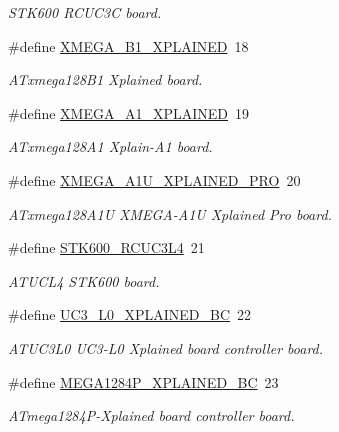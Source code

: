 \begin{DoxyCompactItemize}
\begin{DoxyCompactList}\small\item\em S\+T\+K600 R\+C\+U\+C3C board. \end{DoxyCompactList}\item 
\#define \mbox{\hyperlink{group__group__common__boards_ga65d609abff1a09882fd8a778c97f8ab2}{X\+M\+E\+G\+A\+\_\+\+B1\+\_\+\+X\+P\+L\+A\+I\+N\+ED}}~18
\begin{DoxyCompactList}\small\item\em A\+Txmega128\+B1 Xplained board. \end{DoxyCompactList}\item 
\#define \mbox{\hyperlink{group__group__common__boards_gae79074f51491bf88c25efd857b92cbd4}{X\+M\+E\+G\+A\+\_\+\+A1\+\_\+\+X\+P\+L\+A\+I\+N\+ED}}~19
\begin{DoxyCompactList}\small\item\em A\+Txmega128\+A1 Xplain-\/\+A1 board. \end{DoxyCompactList}\item 
\#define \mbox{\hyperlink{group__group__common__boards_ga966caec7a287f05d293e525b0ee0ee4d}{X\+M\+E\+G\+A\+\_\+\+A1\+U\+\_\+\+X\+P\+L\+A\+I\+N\+E\+D\+\_\+\+P\+RO}}~20
\begin{DoxyCompactList}\small\item\em A\+Txmega128\+A1U X\+M\+E\+G\+A-\/\+A1U Xplained Pro board. \end{DoxyCompactList}\item 
\#define \mbox{\hyperlink{group__group__common__boards_ga8eec8cd16b9138bb1117e9381138a3fc}{S\+T\+K600\+\_\+\+R\+C\+U\+C3\+L4}}~21
\begin{DoxyCompactList}\small\item\em A\+T\+U\+C\+L4 S\+T\+K600 board. \end{DoxyCompactList}\item 
\#define \mbox{\hyperlink{group__group__common__boards_gab872a6d2f79f1bbb274b5f9fff4b855f}{U\+C3\+\_\+\+L0\+\_\+\+X\+P\+L\+A\+I\+N\+E\+D\+\_\+\+BC}}~22
\begin{DoxyCompactList}\small\item\em A\+T\+U\+C3\+L0 U\+C3-\/\+L0 Xplained board controller board. \end{DoxyCompactList}\item 
\#define \mbox{\hyperlink{group__group__common__boards_ga9acdb5a6b5436d3bf40bdfa8c1338152}{M\+E\+G\+A1284\+P\+\_\+\+X\+P\+L\+A\+I\+N\+E\+D\+\_\+\+BC}}~23
\begin{DoxyCompactList}\small\item\em A\+Tmega1284\+P-\/\+Xplained board controller board. \end{DoxyCompactList}\item 

\end{DoxyCompactItemize}
